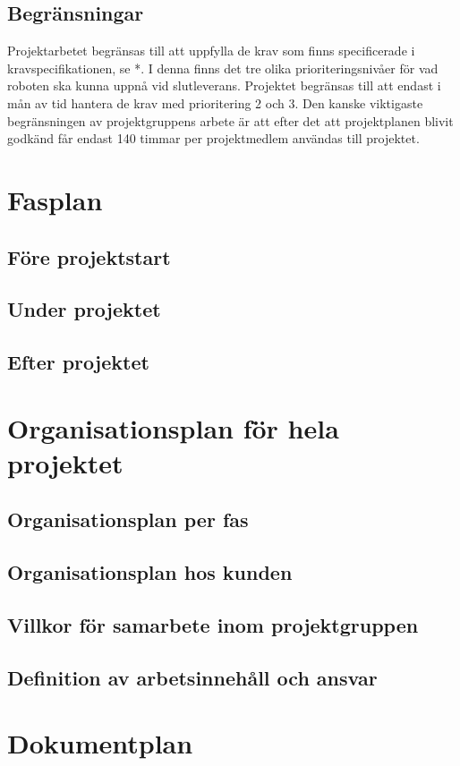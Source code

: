 \documentclass[a4paper,12pt]{article}
\begin{document}
\subsection{Begränsningar}
Projektarbetet begränsas till att uppfylla de krav som finns specificerade i kravspecifikationen, se *. I denna finns det tre olika prioriteringsnivåer för vad roboten ska kunna uppnå vid slutleverans. Projektet begränsas till att endast i mån av tid hantera de krav med prioritering 2 och 3.
Den kanske viktigaste begränsningen av projektgruppens arbete är att efter det att projektplanen blivit godkänd får endast 140 timmar per projektmedlem användas till projektet.

\section{Fasplan}		
\subsection{Före projektstart}
\subsection{Under projektet}
\subsection{Efter projektet}


\section{Organisationsplan för hela projektet}	%
\subsection{Organisationsplan per fas}
\subsection{Organisationsplan hos kunden}
\subsection{Villkor för samarbete inom projektgruppen}
\subsection{Definition av arbetsinnehåll och ansvar}

\section{Dokumentplan}	%
\end{document}
